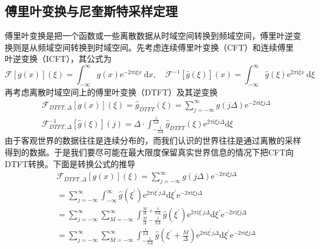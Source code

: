 \subsection{傅里叶变换与尼奎斯特采样定理}
傅里叶变换是把一个函数或一些离散数据从时域空间转换到频域空间，傅里叶逆变换则是从频域空间转换到时域空间\cite{xu2018understanding}。先考虑连续傅里叶变换（CFT）和连续傅里叶逆变换（ICFT），其公式为
    \begin{equation}
\mathcal{F}[g(x)](\xi)=\int_{-\infty}^{\infty} g(x) \mathrm{e}^{-2 \pi \mathrm{i} \xi x} \mathrm{~d} x, \quad \mathcal{F}^{-1}[\hat{g}(\xi)](x)=\int_{-\infty}^{\infty} \hat{g}(\xi) \mathrm{e}^{2 \pi \mathrm{i} \xi x} \mathrm{~d} \xi
\end{equation}
再考虑离散时域空间上的傅里叶变换（DTFT）及其逆变换
\begin{equation}
\begin{aligned}
& \mathcal{F}_{D T F T, \Delta}[g(x)](\xi)=\hat{g}_{D T F T}(\xi)=\sum_{j=-\infty}^{\infty} g(j \Delta) \mathrm{e}^{-2 \pi \mathrm{i} \xi j \Delta} \\
& \mathcal{F}_{D T F T, \Delta}^{-1}[\hat{g}(\xi)](j)=\Delta \cdot \int_{-\frac{1}{2 \Delta}}^{\frac{1}{2 \Delta}} \hat{g}_{D T F T}(\xi) \mathrm{e}^{2 \pi \mathrm{i} \xi j \Delta} \mathrm{d} \xi
\end{aligned}
\end{equation}
由于客观世界的数据往往是连续分布的，而我们认识的世界往往是通过离散的采样得到的数据。于是我们要尽可能在最大限度保留真实世界信息的情况下把CFT向DTFT转换。下面是转换公式的推导
\begin{equation}
\begin{aligned}
& \mathcal{F}_{D T F T, \Delta}[g(x)](\xi)=\sum_{j=-\infty}^{\infty} g(j \Delta) \mathrm{e}^{-2 \pi \mathrm{i} \xi j \Delta} \\
& =\sum_{j=-\infty}^{\infty} \int_{-\infty}^{\infty} \hat{g}\left(\xi^{\prime}\right) \mathrm{e}^{2 \pi \mathrm{i} \xi^{\prime} j \Delta} \mathrm{d} \xi^{\prime} \mathrm{e}^{-2 \pi \mathrm{i} \xi j \Delta} \\
& =\sum_{j=-\infty}^{\infty} \sum_{M=-\infty}^{\infty} \int_{\frac{M}{\Delta}-\frac{1}{2 \Delta}}^{\frac{M}{\Delta}+\frac{1}{2 \Delta}} \hat{g}\left(\xi^{\prime}\right) \mathrm{e}^{2 \pi \mathrm{i} \xi^{\prime} j \Delta} \mathrm{d} \xi^{\prime} \mathrm{e}^{-2 \pi \mathrm{i} \xi j \Delta} \\
& =\sum_{j=-\infty}^{\infty} \sum_{M=-\infty}^{\infty} \int_{-\frac{1}{2 \Delta}}^{\frac{1}{2 \Delta}} \hat{g}\left(\xi^{\prime}+\frac{M}{\Delta}\right) \mathrm{e}^{2 \pi \mathrm{i} \xi^{\prime} j \Delta} \mathrm{d} \xi^{\prime} \mathrm{e}^{-2 \pi \mathrm{i} \xi j \Delta} \\
&
\end{aligned}
\end{equation}

